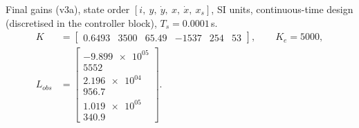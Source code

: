 Final gains (v3a), state order $[i,\ y,\ \dot y,\ x,\ \dot x,\ x_s]$, SI units, continuous-time design (discretised in the controller block), $T_s=0.0001$\,s.
\begin{align*}
K &= \begin{bmatrix}\num{0.6493} & \num{3500} & \num{65.49} & \num{-1537} & \num{254} & \num{53}\end{bmatrix},\qquad K_e = 5000,\\
L_{obs} &= \begin{bmatrix}\num{-9.899e+05}\\ \num{5552}\\ \num{2.196e+04}\\ \num{956.7}\\ \num{1.019e+05}\\ \num{340.9}\end{bmatrix}.
\end{align*}
